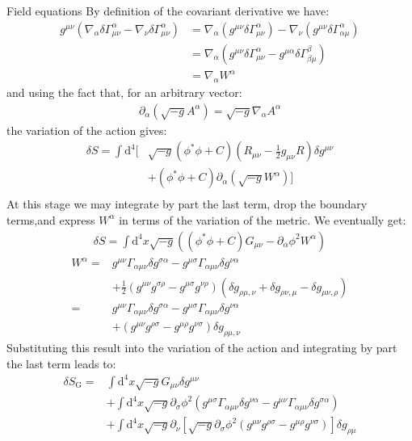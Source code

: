 \begin{subsection}{Field equations}
  By definition of the covariant derivative we have:
  \begin{align}
    g^{\mu\nu}\left(\nabla_\alpha\delta\Gamma_{\mu\nu}^{\alpha}-\nabla_\nu\delta\Gamma_{\mu\nu}^{\alpha}\right) &= \nabla_\alpha\left(g^{\mu\nu}\delta\Gamma_{\mu\nu}^{\alpha}\right)-\nabla_\nu\left(g^{\mu\nu}\delta\Gamma_{\alpha\mu}^{\alpha}\right)\\
    & = \nabla_\alpha\left(g^{\mu\nu}\delta\Gamma_{\mu\nu}^{\alpha}-g^{\mu\alpha}\delta\Gamma_{\beta\mu}^{\beta}\right)\\
    & = \nabla_\alpha W^\alpha
  \end{align}
  and using the fact that, for an arbitrary vector:
  \begin{align}
    \partial_\alpha\left(\sqrt{-g}A^\alpha\right) = \sqrt{-g}\nabla_\alpha A^{\alpha}
  \end{align}
  the variation of the action gives:
  \begin{align}
    \delta S = \int\mathrm{d}^4\bigg[&\sqrt{-g}\left(\phi^*\phi+C\right)\left(R_{\mu\nu}-\frac{1}{2}g_{\mu\nu}R\right)\delta g^{\mu\nu}\\
    &+ (\phi^*\phi+C)\partial_{\alpha}\left(\sqrt{-g}W^\alpha\right)\bigg] \\
  \end{align}
  At this stage we may integrate by part the last term, drop the
  boundary terms,and express $W^\alpha$ in terms of the variation of
  the metric. We eventually get:
  \begin{align}
    \delta S = \int\mathrm{d}^4x\sqrt{-g}\left((\phi^*\phi+C)G_{\mu\nu}-\partial_\alpha\phi^2 W^{\alpha}\right)
  \end{align}
  \begin{align}
    W^\alpha = &g^{\mu\nu}\Gamma_{\alpha\mu\nu}\delta g^{\sigma \alpha}-g^{\mu\sigma} \Gamma_{\alpha\mu\nu}\delta g^{\nu \alpha}\\
    &+ \frac{1}{2}\left(g^{\mu\nu}g^{\sigma\rho}- g^{\mu\sigma}g^{\nu\rho}\right)\left(\delta g_{\rho \mu,\nu}+\delta g_{\rho \nu,\mu}-\delta g_{\mu\nu,\rho}\right)\\
    =& g^{\mu\nu}\Gamma_{\alpha\mu\nu}\delta g^{\sigma \alpha}-g^{\mu\sigma} \Gamma_{\alpha\mu\nu}\delta g^{\nu \alpha}\\
    &+ \left(g^{\mu\nu}g^{\rho\sigma}-g^{\mu\rho}g^{\nu\sigma}\right)\delta g_{\rho\mu,\nu}
  \end{align}
  Substituting this result into the variation of the action and
  integrating by part the last term leads to:
  \begin{align}
    \delta S_{\text{G}} =& \int\mathrm d^4x\sqrt{-g}G_{\mu\nu}\delta g^{\mu\nu}\\
    &+\int\mathrm d^4x\sqrt{-g} \partial_\sigma\phi^2\left(g^{\mu\sigma} \Gamma_{\alpha\mu\nu}\delta g^{\nu \alpha}-g^{\mu\nu}\Gamma_{\alpha\mu\nu}\delta g^{\sigma \alpha}\right)\\
    &+\int\mathrm d^4x\sqrt{-g} \partial_\nu\left[\sqrt{-g}\partial_\sigma\phi^2\left(g^{\mu\nu}g^{\rho\sigma}-g^{\mu\rho}g^{\nu\sigma}\right)\right]\delta g_{\rho\mu}
  \end{align}
\end{subsection}
